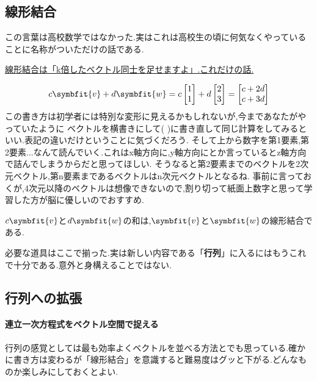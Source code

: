 \subsection{線形結合}
この言葉は高校数学ではなかった.実はこれは高校生の頃に何気なくやっていることに名称がついただけの話である.
\begin{center}
\underline{線形結合は「k倍したベクトル同士を足せますよ」.これだけの話.}    
\end{center}
\[
c\symbfit{v}+d\symbfit{w}=c\begin{bmatrix}1 \\ 1\end{bmatrix}+d\begin{bmatrix}2 \\ 3\end{bmatrix} =
\begin{bmatrix}c+2d \\ c+3d\end{bmatrix}
\]
この書き方は初学者には特別な変形に見えるかもしれないが,今まであなたがやっていたように
ベクトルを横書きにして( \quad )に書き直して同じ計算をしてみるといい.表記の違いだけということに気づくだろう.
そして上から数字を第1要素,第2要素...なんて読んでいく.これはx軸方向に,y軸方向にとか言っているとz軸方向で詰んでしまうからだと思ってほしい.
そうなると第2要素までのベクトルを2次元ベクトル,第n要素まであるベクトルはn次元ベクトルとなるね.
事前に言っておくが,4次元以降のベクトルは想像できないので,割り切って紙面上数字と思って学習した方が脳に優しいのでおすすめ.
\begin{tcolorbox}[colframe=black!80,colback=white,title=線形結合$_{\text{linear combination}}$]
$c\symbfit{v}$と$d\symbfit{w}$の和は,$\symbfit{v}$と$\symbfit{w}$の線形結合である.
\end{tcolorbox}

必要な道具はここで揃った.実は新しい内容である「\textbf{行列}」に入るにはもうこれで十分である.意外と身構えることではない.
\subsection{行列への拡張}
\paragraph{連立一次方程式をベクトル空間で捉える}
行列の感覚としては最も効率よくベクトルを並べる方法とでも思っている.確かに書き方は変わるが「線形結合」を意識すると難易度はグッと下がる.どんなものか楽しみにしておくとよい.

